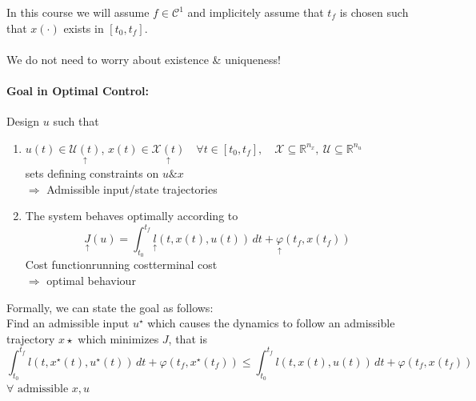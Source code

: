 \documentclass[12pt,a4paper,oneside]{scrartcl}
\begin{document}
	In this course we will assume $f \in\mathcal{C}^1$ and implicitely assume that $t_f$ is chosen such that $x(\cdot)$ exists in $[t_0,t_f]$. \\\\
	We do not need to worry about existence \& uniqueness!
	
	\paragraph{Goal in Optimal Control:}
	Design $u$ such that
	\begin{enumerate}
		\item $u(t) \in \underset{\uparrow}{\mathcal{U}(t)}$, $x(t) \in \underset{\uparrow}{\mathcal{X}(t)} \quad \forall t \in [t_0,t_f], \quad \mathcal{X}\subseteq\mathbb{R}^{n_x}, \ \mathcal{U}\subseteq\mathbb{R}^{n_u}$\\
			sets defining constraints on $u \& x$ \\
			\hspace*{10mm}$\Rightarrow$ Admissible input/state trajectories
		\item
			The system behaves optimally according to
			\[
			\underset{\uparrow}{J}(u) = \int_{t_0}^{t_f} \underset{\uparrow}{l}(t,x(t),u(t))\,dt + \underset{\uparrow}{\varphi}(t_f,x(t_f))
			\]
			\hspace*{18mm}Cost function\hspace*{10mm}running cost\hspace*{10mm}terminal cost\\
			\hspace*{10mm}$\Rightarrow$ optimal behaviour
	\end{enumerate}
	
	Formally, we can state the goal as follows: \\
	Find an admissible input $u^\star$ which causes the dynamics to follow an admissible trajectory $x\star$ which minimizes $J$, that is
	\[
	\int_{t_0}^{t_f} l(t,x^\star(t),u^\star(t))\,dt + \varphi(t_f,x^\star(t_f)) \leq \int_{t_0}^{t_f} l(t,x(t),u(t))\,dt + \varphi(t_f,x(t_f))
	\]
	\hspace*{100mm}$\forall \text{ admissible } x,u$
	
\end{document}
